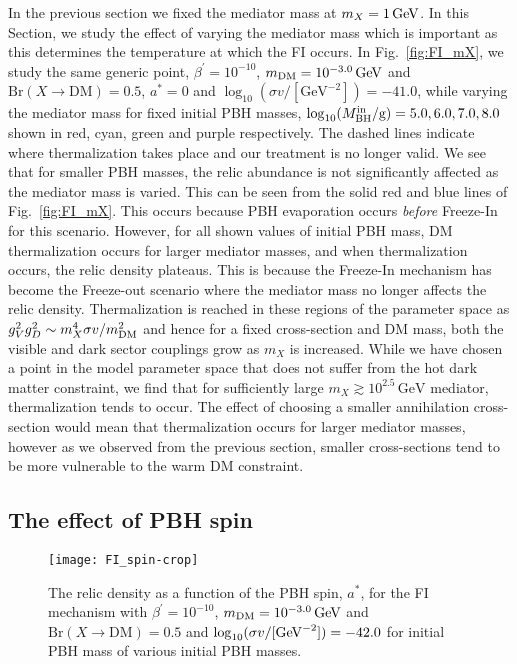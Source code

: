 \documentclass[aps,prd,reprint,twocolumn,preprintnumbers,floatfix,nofootinbib]{revtex4-1}
\newcommand{\mDM}{m_{\rm DM}}
\newcommand{\MBH}{M_{\rm BH}}
\newcommand{\figref}[1]{Fig.~\ref{#1}}
\begin{document}
In the previous section we fixed the mediator mass at $m_X = 1\,\rm{GeV}$. 
In this Section,  we study the effect of varying the mediator mass which is important as this determines the temperature at which the FI occurs. In \figref{fig:FI_mX}, we study the same generic point, $\beta^\prime = 10^{-10}$, 
 $\mDM = 10^{-3.0}\, \rm{GeV}$  and $\mathrm{Br}(X\to \mathrm{DM}) = 0.5$, $a^{*}=0$ and $\log_{10}(\sigma v/ [\text{GeV}^{-2}]) = -41.0$, while varying the mediator mass for fixed initial PBH masses, $\log_{10}(\MBH^{\rm in}/\text{g}) = 5.0, 6.0, 7.0, 8.0$ shown in red, cyan, green and purple respectively. The dashed lines indicate where thermalization takes place and our treatment is no longer valid. 
We see that for smaller PBH masses, the relic abundance is not significantly affected as the mediator mass is varied. This can be seen from the solid red and blue lines of \figref{fig:FI_mX}. This occurs because PBH evaporation occurs \emph{before} Freeze-In for this scenario. However, for all shown values of initial PBH mass, DM thermalization occurs for larger mediator masses, and when thermalization occurs, the relic density plateaus.  This is because the Freeze-In mechanism has become the Freeze-out scenario where the mediator mass no longer affects the relic density. Thermalization is reached in these regions of the parameter space as $g_V^2g_D^2 \sim m^4_{X}\sigma v/ \mDM^2$ and hence for a fixed cross-section and DM mass, both the visible and dark sector couplings grow as $m_X$ is increased.  While we have chosen a point in the model parameter space that does not suffer from the hot dark matter constraint, we find that for sufficiently large $m_{X}\gtrsim 10^{2.5}\,\text{GeV}$ mediator, thermalization tends to occur. The effect of choosing a smaller annihilation cross-section would mean that thermalization occurs for larger mediator masses, however as we observed from the previous section, smaller cross-sections tend to be more vulnerable to the warm DM constraint. 


\subsection{The effect of PBH spin}
\begin{figure}[t!]
\centering
 \texttt{[image: FI\_spin-crop]}
 \caption{\label{fig:FI_spin} The  relic density as a function of the PBH spin, $a^*$, for the FI mechanism with $\beta^\prime = 10^{-10}$, 
 $\mDM = 10^{-3.0}\, \rm{GeV}$  and $\mathrm{Br}(X\to \mathrm{DM}) = 0.5$ and $\log_{10}(\sigma v/[\rm{GeV}^{-2}]) = -42.0$ for
initial PBH mass of  various initial PBH masses.}
 \end{figure}
 
\end{document}
